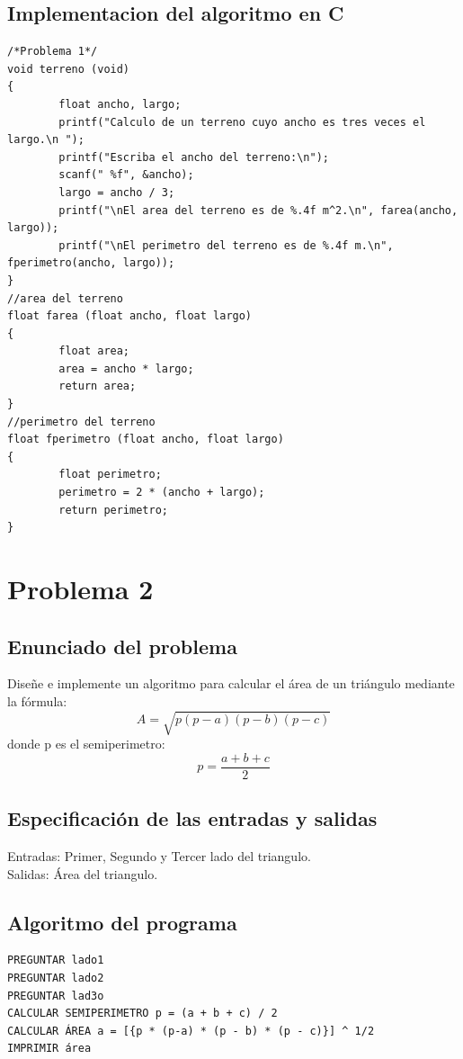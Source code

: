 \documentclass[12pt]{article}
\begin{document}
\subsection{Implementacion del algoritmo en C}
\begin{lstlisting}
/*Problema 1*/
void terreno (void)
{
        float ancho, largo;
        printf("Calculo de un terreno cuyo ancho es tres veces el largo.\n ");
        printf("Escriba el ancho del terreno:\n");
        scanf(" %f", &ancho);
        largo = ancho / 3;
        printf("\nEl area del terreno es de %.4f m^2.\n", farea(ancho, largo));
        printf("\nEl perimetro del terreno es de %.4f m.\n", fperimetro(ancho, largo));
}
//area del terreno
float farea (float ancho, float largo)
{
        float area;
        area = ancho * largo;
        return area;
}
//perimetro del terreno
float fperimetro (float ancho, float largo)
{
        float perimetro;
        perimetro = 2 * (ancho + largo);
        return perimetro;
}
\end{lstlisting}
\section{Problema 2}

\subsection{Enunciado del problema}
Diseñe e implemente un algoritmo para calcular el área de un triángulo mediante
la fórmula:
\[
	A = \sqrt{p(p-a)(p-b)(p-c)}
\]
donde p es el semiperimetro: 
\[
	p = \frac{a + b + c}{2}
\]
\subsection{Especificación de las entradas y salidas}
Entradas: Primer, Segundo y Tercer lado del triangulo.\\
Salidas: Área del triangulo.
\subsection{Algoritmo del programa}
\begin{verbatim}
PREGUNTAR lado1
PREGUNTAR lado2
PREGUNTAR lad3o
CALCULAR SEMIPERIMETRO p = (a + b + c) / 2
CALCULAR ÁREA a = [{p * (p-a) * (p - b) * (p - c)}] ^ 1/2
IMPRIMIR área
\end{verbatim}
\end{document}
